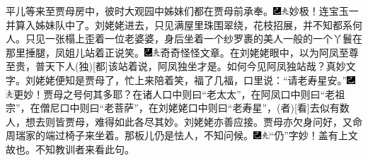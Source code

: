 平儿等来至贾母房中，彼时大观园中姊妹们都在贾母前承奉。{\includegraphics[width=3mm]{../Images/00003}\includegraphics[width=3mm]{../Images/00012}\footnotesize \kaishu 妙极！连宝玉一并算入姊妹队中了。}刘姥姥进去，只见满屋里珠围翠绕，花枝招展，并不知都系何人。只见一张榻上歪着一位老婆婆，身后坐着一个纱罗裹的美人一般的一个丫鬟在那里捶腿，凤姐儿站着正说笑。{\includegraphics[width=3mm]{../Images/00003}\includegraphics[width=3mm]{../Images/00012}\footnotesize \kaishu 奇奇怪怪文章。在刘姥姥眼中，以为阿凤至尊至贵，普天下人{(独)}{[}都{]}该站着说，阿凤独坐才是。如何今见阿凤独站哉？真妙文字。}刘姥姥便知是贾母了，忙上来陪着笑，福了几福，口里说：``请老寿星安。''{\includegraphics[width=3mm]{../Images/00003}\includegraphics[width=3mm]{../Images/00012}\footnotesize \kaishu 更妙！贾母之号何其多耶？在诸人口中则曰``老太太''，在阿凤口中则曰``老祖宗''，在僧尼口中则曰``老菩萨''，在刘姥姥口中则曰``老寿星''，{(者)}{[}看{]}去似有数人，想去则皆贾母，难得如此各尽其妙。刘姥姥亦善应接。}贾母亦欠身问好，又命周瑞家的端过椅子来坐着。那板儿仍是怯人，不知问候。{\includegraphics[width=3mm]{../Images/00003}\includegraphics[width=3mm]{../Images/00012}\footnotesize \kaishu ``仍''字妙！盖有上文故也。不知教训者来看此句。}

